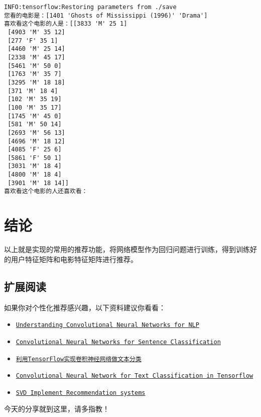 \documentclass[11pt]{article}
\begin{document}
    \begin{Verbatim}[commandchars=\\\{\}]
INFO:tensorflow:Restoring parameters from ./save
您看的电影是：[1401 'Ghosts of Mississippi (1996)' 'Drama']
喜欢看这个电影的人是：[[3833 'M' 25 1]
 [4903 'M' 35 12]
 [277 'F' 35 1]
 [4460 'M' 25 14]
 [2338 'M' 45 17]
 [5461 'M' 50 0]
 [1763 'M' 35 7]
 [3295 'M' 18 18]
 [371 'M' 18 4]
 [102 'M' 35 19]
 [100 'M' 35 17]
 [1745 'M' 45 0]
 [581 'M' 50 14]
 [2693 'M' 56 13]
 [4696 'M' 18 12]
 [4085 'F' 25 6]
 [5861 'F' 50 1]
 [3031 'M' 18 4]
 [4800 'M' 18 4]
 [3901 'M' 18 14]]
喜欢看这个电影的人还喜欢看：

    \end{Verbatim}

    \section{结论}\label{ux7ed3ux8bba}

以上就是实现的常用的推荐功能，将网络模型作为回归问题进行训练，得到训练好的用户特征矩阵和电影特征矩阵进行推荐。

    \subsection{扩展阅读}\label{ux6269ux5c55ux9605ux8bfb}

如果你对个性化推荐感兴趣，以下资料建议你看看：

    \begin{itemize}
\item
  \href{http://www.wildml.com/2015/11/understanding-convolutional-neural-networks-for-nlp/}{\texttt{Understanding\ Convolutional\ Neural\ Networks\ for\ NLP}}
\item
  \href{https://github.com/yoonkim/CNN_sentence}{\texttt{Convolutional\ Neural\ Networks\ for\ Sentence\ Classification}}
\item
  \href{http://www.jianshu.com/p/ed3eac3dcb39?from=singlemessage}{\texttt{利用TensorFlow实现卷积神经网络做文本分类}}
\item
  \href{https://github.com/dennybritz/cnn-text-classification-tf}{\texttt{Convolutional\ Neural\ Network\ for\ Text\ Classification\ in\ Tensorflow}}
\item
  \href{https://github.com/songgc/TF-recomm}{\texttt{SVD\ Implement\ Recommendation\ systems}}
\end{itemize}

    今天的分享就到这里，请多指教！


    
    
    
    
\end{document}
